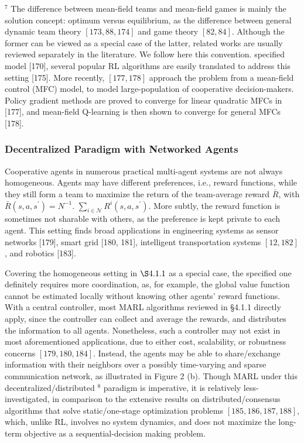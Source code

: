 \documentclass[10pt]{article}
\begin{document}
${ }^{7}$ The difference between mean-field teams and mean-field games is mainly the solution concept: optimum versus equilibrium, as the difference between general dynamic team theory $[173,88,174]$ and game theory $[82,84]$. Although the former can be viewed as a special case of the latter, related works are usually reviewed separately in the literature. We follow here this convention. specified model [170], several popular RL algorithms are easily translated to address this setting [175]. More recently, $[177,178]$ approach the problem from a mean-field control (MFC) model, to model large-population of cooperative decision-makers. Policy gradient methods are proved to converge for linear quadratic MFCs in [177], and mean-field Q-learning is then shown to converge for general MFCs [178].

\subsubsection{Decentralized Paradigm with Networked Agents}
Cooperative agents in numerous practical multi-agent systems are not always homogeneous. Agents may have different preferences, i.e., reward functions, while they still form a team to maximize the return of the team-average reward $\bar{R}$, with $\bar{R}\left(s, a, s^{\prime}\right)=N^{-1}$. $\sum_{i \in \mathcal{N}} R^{i}\left(s, a, s^{\prime}\right)$. More subtly, the reward function is sometimes not sharable with others, as the preference is kept private to each agent. This setting finds broad applications in engineering systems as sensor networks [179], smart grid [180, 181], intelligent transportation systems $[12,182]$, and robotics [183].

Covering the homogeneous setting in $\S 4.1 .1$ as a special case, the specified one definitely requires more coordination, as, for example, the global value function cannot be estimated locally without knowing other agents' reward functions. With a central controller, most MARL algorithms reviewed in §4.1.1 directly apply, since the controller can collect and average the rewards, and distributes the information to all agents. Nonetheless, such a controller may not exist in most aforementioned applications, due to either cost, scalability, or robustness concerns $[179,180,184]$. Instead, the agents may be able to share/exchange information with their neighbors over a possibly time-varying and sparse communication network, as illustrated in Figure 2 (b). Though MARL under this decentralized/distributed ${ }^{8}$ paradigm is imperative, it is relatively less-investigated, in comparison to the extensive results on distributed/consensus algorithms that solve static/one-stage optimization problems $[185,186,187,188]$, which, unlike RL, involves no system dynamics, and does not maximize the long-term objective as a sequential-decision making problem.
\end{document}
